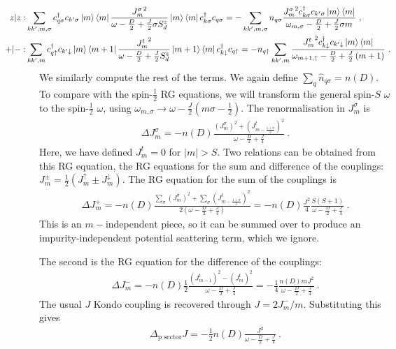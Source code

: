 \documentclass[10pt]{iopart}
\begin{document}
\begin{eqnarray}
	\hspace*{-40pt}z|z: & \sum_{kk^\prime,m,\sigma} c^\dagger_{q \sigma} c_{k^\prime \sigma} \ket{m}\bra{m}\frac{{J^\sigma_m}^2}{\omega - \frac{D}{2} + \frac{J}{2}\sigma S_d^z}\ket{m}\bra{m} c^\dagger_{k \sigma}c_{q \sigma} = -\sum_{kk^\prime,m,\sigma}n_{q \sigma}\frac{{J^\sigma_m}^2 c^\dagger_{k \sigma}c_{k^\prime\sigma} \ket{m}\bra{m}}{\omega_{m, \sigma} - \frac{D}{2} + \frac{J}{2}\sigma m}~,\nonumber\\
	\hspace*{-40pt}+|-: & \sum_{kk^\prime,m} c^\dagger_{q \uparrow} c_{k^\prime \downarrow} \ket{m}\bra{m+1}\frac{{J^t_m}^2}{\omega - \frac{D}{2} + \frac{J}{2}S_d^z}\ket{m+1}\bra{m} c^\dagger_{k \downarrow}c_{q \uparrow} = -n_{q \uparrow}\sum_{kk^\prime,m}\frac{{J^t_m}^2 c^\dagger_{k \downarrow}c_{k^\prime\downarrow} \ket{m}\bra{m}}{\omega_{m+1, \uparrow} - \frac{D}{2} + \frac{J}{2}\left( m+1 \right) }~.
\end{eqnarray}
We similarly compute the rest of the terms. We again define \(\sum_q \hat n_{q\sigma} = n(D)\). To compare with the spin-\(\frac{1}{2}\) RG equations, we will transform the general spin-\(S\) \(\omega\) to the spin-\(\frac{1}{2}\) \( \omega\), using \(\omega_{m,\sigma} \to \omega - \frac{J}{2}\left(m\sigma - \frac{1}{2}\right)\).
The renormalisation in \(J^\sigma_m\) is
\begin{eqnarray}
	\Delta J^\sigma_{m} = - n(D) \frac{\left( J^\sigma_m \right) ^2 + \left( J^t_{m-\frac{1+\sigma}{2}} \right) ^2}{\omega - \frac{D}{2} + \frac{J}{4}}~.
\end{eqnarray}
Here, we have defined \(J^t_m = 0\) for \( |m| > S\). Two relations can be obtained from this RG equation, the RG equations for the sum and difference of the couplings: \(J^\pm_m = \frac{1}{2}\left(J^\uparrow_m \pm J^\downarrow_m\right) \). The RG equation for the sum of the couplings is
\begin{eqnarray}
	\Delta J^+_m = -n(D)\frac{\sum_\sigma \left( J^\sigma_m \right) ^2 + \sum_\sigma \left( J^t_{m-\frac{1+\sigma}{2}} \right) ^2}{2\left(\omega - \frac{D}{2} + \frac{J}{4}\right)} = -n(D)\frac{J^2}{4}\frac{S(S+1)}{\omega - \frac{D}{2} + \frac{J}{4}}~.
\end{eqnarray}
This is an \(m-\)independent piece, so it can be summed over to produce an impurity-independent potential scattering term, which we ignore. 

The second is the RG equation for the difference of the couplings:
\begin{eqnarray}
	\Delta J^-_m = -n(D)\frac{1}{2}\frac{\left( J^t_{m-1} \right) ^2 - \left(J^t_{m}\right) ^2}{\omega - \frac{D}{2} + \frac{J}{4}} = -\frac{1}{4}\frac{n(D) m J^2}{\omega - \frac{D}{2} + \frac{J}{4}}~.
\end{eqnarray}
The usual \(J\) Kondo coupling is recovered through \(J = 2J^-_m/m\). Substituting this gives 
\begin{eqnarray}
	\Delta_\text{p sector} J = -\frac{1}{2}n(D)\frac{J^2}{\omega - \frac{D}{2} + \frac{J}{4}}~.
\end{eqnarray}
\end{document}
